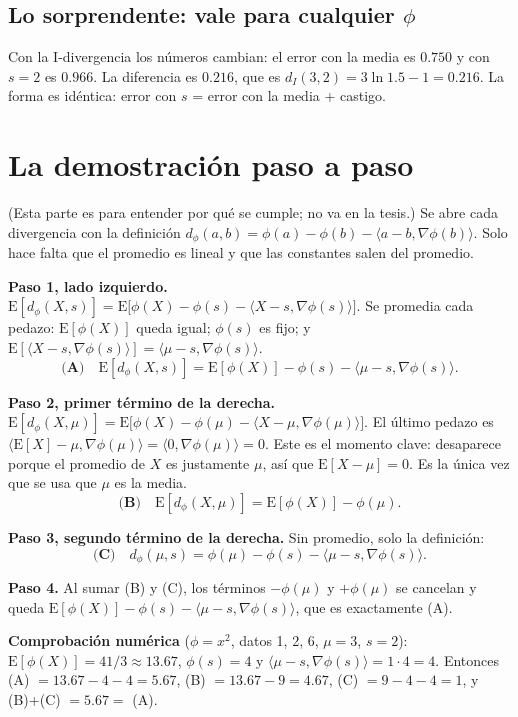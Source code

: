 \documentclass[11pt,a4paper]{article}
\begin{document}
\subsection{Lo sorprendente: vale para cualquier $\phi$}

Con la I-divergencia los números cambian: el error con la media es $0.750$ y con
$s=2$ es $0.966$. La diferencia es $0.216$, que es $d_I(3,2)=3\ln1.5-1=0.216$. La
forma es idéntica: error con $s$ = error con la media + castigo.

\section{La demostración paso a paso}

(Esta parte es para entender por qué se cumple; no va en la tesis.) Se abre cada
divergencia con la definición
$d_\phi(a,b)=\phi(a)-\phi(b)-\langle a-b,\nabla\phi(b)\rangle$. Solo hace falta
que el promedio es lineal y que las constantes salen del promedio.

\textbf{Paso 1, lado izquierdo.}
$\mathrm{E}[d_\phi(X,s)]=\mathrm{E}\bigl[\phi(X)-\phi(s)-\langle X-s,\nabla\phi(s)\rangle\bigr]$.
Se promedia cada pedazo: $\mathrm{E}[\phi(X)]$ queda igual; $\phi(s)$ es fijo; y
$\mathrm{E}[\langle X-s,\nabla\phi(s)\rangle]=\langle\mu-s,\nabla\phi(s)\rangle$.
\[
  \textbf{(A)}\quad \mathrm{E}[d_\phi(X,s)]=\mathrm{E}[\phi(X)]-\phi(s)-\langle\mu-s,\nabla\phi(s)\rangle .
\]

\textbf{Paso 2, primer término de la derecha.}
$\mathrm{E}[d_\phi(X,\mu)]=\mathrm{E}\bigl[\phi(X)-\phi(\mu)-\langle X-\mu,\nabla\phi(\mu)\rangle\bigr]$.
El último pedazo es $\langle \mathrm{E}[X]-\mu,\nabla\phi(\mu)\rangle=\langle0,\nabla\phi(\mu)\rangle=0$.
Este es el momento clave: desaparece porque el promedio de $X$ es justamente
$\mu$, así que $\mathrm{E}[X-\mu]=0$. Es la única vez que se usa que $\mu$ es la
media.
\[
  \textbf{(B)}\quad \mathrm{E}[d_\phi(X,\mu)]=\mathrm{E}[\phi(X)]-\phi(\mu).
\]

\textbf{Paso 3, segundo término de la derecha.} Sin promedio, solo la definición:
\[
  \textbf{(C)}\quad d_\phi(\mu,s)=\phi(\mu)-\phi(s)-\langle\mu-s,\nabla\phi(s)\rangle .
\]

\textbf{Paso 4.} Al sumar (B) y (C), los términos $-\phi(\mu)$ y $+\phi(\mu)$ se
cancelan y queda $\mathrm{E}[\phi(X)]-\phi(s)-\langle\mu-s,\nabla\phi(s)\rangle$,
que es exactamente (A).

\textbf{Comprobación numérica} ($\phi=x^2$, datos 1, 2, 6, $\mu=3$, $s=2$):
$\mathrm{E}[\phi(X)]=41/3\approx13.67$, $\phi(s)=4$ y
$\langle\mu-s,\nabla\phi(s)\rangle=1\cdot4=4$. Entonces (A) $=13.67-4-4=5.67$,
(B) $=13.67-9=4.67$, (C) $=9-4-4=1$, y (B)+(C) $=5.67=$ (A).
\end{document}
